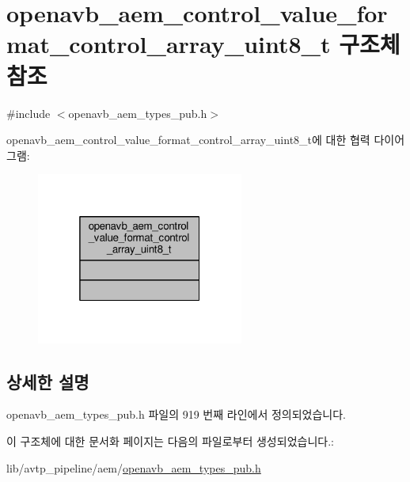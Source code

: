 \hypertarget{structopenavb__aem__control__value__format__control__array__uint8__t}{}\section{openavb\+\_\+aem\+\_\+control\+\_\+value\+\_\+format\+\_\+control\+\_\+array\+\_\+uint8\+\_\+t 구조체 참조}
\label{structopenavb__aem__control__value__format__control__array__uint8__t}


{\ttfamily \#include $<$openavb\+\_\+aem\+\_\+types\+\_\+pub.\+h$>$}



openavb\+\_\+aem\+\_\+control\+\_\+value\+\_\+format\+\_\+control\+\_\+array\+\_\+uint8\+\_\+t에 대한 협력 다이어그램\+:
\nopagebreak
\begin{figure}[H]
\begin{center}
\leavevmode
\includegraphics[width=193pt]{structopenavb__aem__control__value__format__control__array__uint8__t__coll__graph}
\end{center}
\end{figure}


\subsection{상세한 설명}


openavb\+\_\+aem\+\_\+types\+\_\+pub.\+h 파일의 919 번째 라인에서 정의되었습니다.



이 구조체에 대한 문서화 페이지는 다음의 파일로부터 생성되었습니다.\+:\begin{DoxyCompactItemize}
\item 
lib/avtp\+\_\+pipeline/aem/\hyperlink{openavb__aem__types__pub_8h}{openavb\+\_\+aem\+\_\+types\+\_\+pub.\+h}\end{DoxyCompactItemize}

